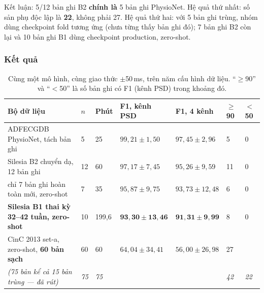 Kết luận: 5/12 bản ghi B2 \textbf{chính là} 5 bản ghi PhysioNet. Hệ quả thứ nhất: số sản phụ độc lập
là \textbf{22}, không phải 27. Hệ quả thứ hai: với 5 bản ghi trùng, nhóm dùng checkpoint fold tương ứng
(chưa từng thấy bản ghi đó); 7 bản ghi B2 còn lại và 10 bản ghi B1 dùng checkpoint production, zero-shot.

\subsubsection{Kết quả}

\begin{table}[H]\centering\small
\caption{Cùng một mô hình, cùng giao thức $\pm$50\,ms, trên năm cấu hình dữ liệu. ``$\geq$90'' và ``$<$50''
là số bản ghi có F1 (kênh PSD) trong khoảng đó.}
\label{tab:silesia_tonghop}
\begin{tabular}{@{}L{5.0cm} C{0.8cm} C{1.2cm} C{2.6cm} C{2.6cm} C{0.8cm} C{0.8cm}@{}}
\toprule
\textbf{Bộ dữ liệu} & $n$ & \textbf{Phút} & \textbf{F1, kênh PSD} & \textbf{F1, 4 kênh} & $\geq$90 & $<$50 \\
\midrule
ADFECGDB PhysioNet, tách bản ghi & 5 & 25 & $99{,}21 \pm 1{,}50$ & $97{,}45 \pm 2{,}96$ & 5 & 0 \\
Silesia B2 chuyển dạ, 12 bản ghi & 12 & 60 & $97{,}17 \pm 7{,}45$ & $95{,}26 \pm 9{,}59$ & 11 & 0 \\
\quad chỉ 7 bản ghi hoàn toàn mới, zero-shot & 7 & 35 & $95{,}87 \pm 9{,}75$ & $93{,}73 \pm 12{,}48$ & 6 & 0 \\
\textbf{Silesia B1 thai kỳ 32--42 tuần, zero-shot} & 10 & 199,6 & $\mathbf{93{,}30 \pm 13{,}46}$ &
$\mathbf{91{,}31 \pm 9{,}99}$ & 8 & 0 \\
CinC 2013 set-a, zero-shot, \textbf{60 bản sạch} & 60 & 60 & $64{,}04 \pm 34{,}41$ & $56{,}00 \pm 26{,}98$ &
27 &  \\
\quad \textit{(75 bản kể cả 15 bản trùng --- đã rút)} & \textit{75} & \textit{75} &
 &  & \textit{42} & \textit{22} \\
\bottomrule
\end{tabular}
\end{table}

